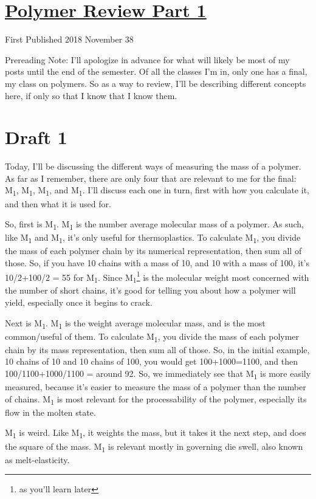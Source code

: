 \documentclass[12pt]{article}[titlepage]
\newcommand{\1}{\={a}}
\newcommand{\2}{\={e}}
\newcommand{\3}{\={\i}}
\newcommand{\4}{\=o}
\newcommand{\5}{\=u}
\newcommand{\6}{\={A}}
\newcommand{\sub}[1]{\textsubscript{1}}
\renewcommand{\,}{\textsuperscript{,}}
\begin{document}
\doublespacing
\section{\href{polymer-1.html}{Polymer Review Part 1}}
First Published 2018 November 38

Prereading Note: I'll apologize in advance for what will likely be most of my posts until the end of the semester.
Of all the classes I'm in, only one has a final, my class on polymers.
So as a way to review, I'll be describing different concepts here, if only so that I know that I know them.
\section{Draft 1}
Today, I'll be discussing the different ways of measuring the mass of a polymer.
As far as I remember, there are only four that are relevant to me for the final: M\sub{n}, M\sub{w}, M\sub{z}, and M\sub{e}.
I'll discuss each one in turn, first with how you calculate it, and then what it is used for.

So, first is M\sub{n}.
M\sub{n} is the number average molecular mass of a polymer.
As such, like M\sub{w} and M\sub{z}, it's only useful for thermoplastics.
To calculate M\sub{n}, you divide the mass of each polymer chain by its numerical representation, then sum all of those.
So, if you have 10 chains with a mass of 10, and 10 with a mass of 100, it's 10/2+100/2 = 55 for M\sub{n}.
Since M\sub{n}\footnote{as you'll learn later} is the molecular weight most concerned with the number of short chains, it's good for telling you about how a polymer will yield, especially once it begins to crack.

Next is M\sub{w}.
M\sub{w} is the weight average molecular mass, and is the most common/useful of them.
To calculate M\sub{w}, you divide the mass of each polymer chain by its mass representation, then sum all of those.
So, in the initial example, 10 chains of 10 and 10 chains of 100, you would get 100+1000=1100, and then 100/1100+1000/1100 = around 92.
So, we immediately see that M\sub{w} is more easily measured, because it's easier to measure the mass of a polymer than the number of chains.
M\sub{w} is most relevant for the processability of the polymer, especially its flow in the molten state.

M\sub{z} is weird.
Like M\sub{w}, it weights the mass, but it takes it the next step, and does the square of the mass.
M\sub{w} is relevant mostly in governing die swell, also known as melt-elasticity.
\end{document}

